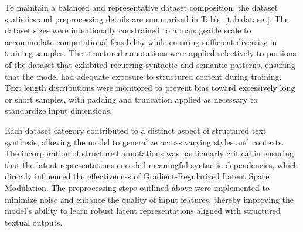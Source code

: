 \documentclass{article}
\begin{document}
To maintain a balanced and representative dataset composition, the dataset statistics and preprocessing details are summarized in Table~\ref{tab:dataset}. The dataset sizes were intentionally constrained to a manageable scale to accommodate computational feasibility while ensuring sufficient diversity in training samples. The structured annotations were applied selectively to portions of the dataset that exhibited recurring syntactic and semantic patterns, ensuring that the model had adequate exposure to structured content during training. Text length distributions were monitored to prevent bias toward excessively long or short samples, with padding and truncation applied as necessary to standardize input dimensions. 

\begin{table}[h]
	\centering
	\caption{Summary of datasets and preprocessing techniques}
	\label{tab:dataset}
\end{table}

Each dataset category contributed to a distinct aspect of structured text synthesis, allowing the model to generalize across varying styles and contexts. The incorporation of structured annotations was particularly critical in ensuring that the latent representations encoded meaningful syntactic dependencies, which directly influenced the effectiveness of Gradient-Regularized Latent Space Modulation. The preprocessing steps outlined above were implemented to minimize noise and enhance the quality of input features, thereby improving the model’s ability to learn robust latent representations aligned with structured textual outputs.
\end{document}
